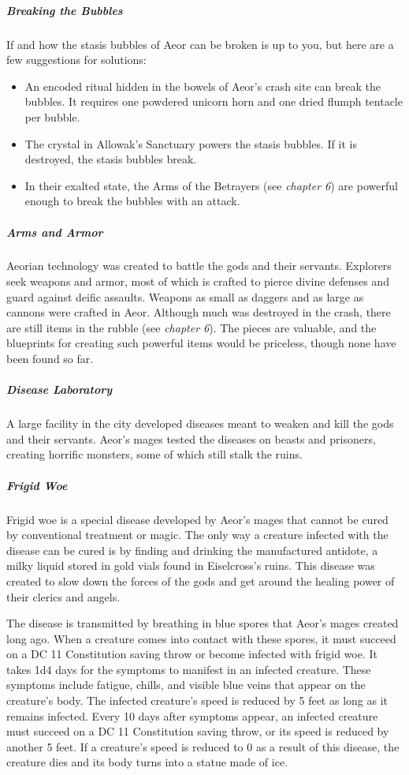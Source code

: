 \documentclass[10pt,a4paper,twoside,bg=print,twocolumn,openany,nodeprecatedcode]{dndbook}
\begin{document}
\subparagraph{Breaking the Bubbles}
If and how the stasis bubbles of Aeor can be broken is up to you, but here are a few suggestions for solutions:


\begin{itemize}
\item An encoded ritual hidden in the bowels of Aeor's crash site can break the bubbles. It requires one powdered unicorn horn and one dried flumph tentacle per bubble.
\item The crystal in Allowak's Sanctuary powers the stasis bubbles. If it is destroyed, the stasis bubbles break.
\item In their exalted state, the Arms of the Betrayers (see \textit{chapter 6}) are powerful enough to break the bubbles with an attack.
\end{itemize}

\subparagraph{Arms and Armor}
Aeorian technology was created to battle the gods and their servants. Explorers seek weapons and armor, most of which is crafted to pierce divine defenses and guard against deific assaults. Weapons as small as daggers and as large as cannons were crafted in Aeor. Although much was destroyed in the crash, there are still items in the rubble (see \textit{chapter 6}). The pieces are valuable, and the blueprints for creating such powerful items would be priceless, though none have been found so far.

\subparagraph{Disease Laboratory}
A large facility in the city developed diseases meant to weaken and kill the gods and their servants. Aeor's mages tested the diseases on beasts and prisoners, creating horrific monsters, some of which still stalk the ruins.

\subparagraph{Frigid Woe}
Frigid woe is a special disease developed by Aeor's mages that cannot be cured by conventional treatment or magic. The only way a creature infected with the disease can be cured is by finding and drinking the manufactured antidote, a milky liquid stored in gold vials found in Eiselcross's ruins. This disease was created to slow down the forces of the gods and get around the healing power of their clerics and angels.

The disease is transmitted by breathing in blue spores that Aeor's mages created long ago. When a creature comes into contact with these spores, it must succeed on a DC 11 Constitution saving throw or become infected with frigid woe. It takes 1d4 days for the symptoms to manifest in an infected creature. These symptoms include fatigue, chills, and visible blue veins that appear on the creature's body. The infected creature's speed is reduced by 5 feet as long as it remains infected. Every 10 days after symptoms appear, an infected creature must succeed on a DC 11 Constitution saving throw, or its speed is reduced by another 5 feet. If a creature's speed is reduced to 0 as a result of this disease, the creature dies and its body turns into a statue made of ice.
\end{document}
